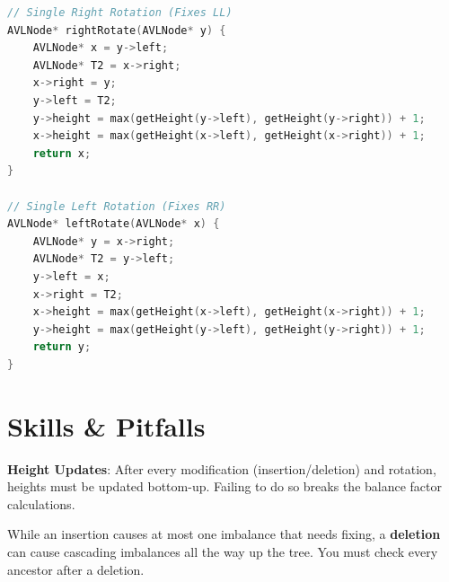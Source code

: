 \begin{lstlisting}[language=C, caption={AVL Single Rotations}]
// Single Right Rotation (Fixes LL)
AVLNode* rightRotate(AVLNode* y) {
    AVLNode* x = y->left;
    AVLNode* T2 = x->right;
    x->right = y;
    y->left = T2;
    y->height = max(getHeight(y->left), getHeight(y->right)) + 1;
    x->height = max(getHeight(x->left), getHeight(x->right)) + 1;
    return x;
}

// Single Left Rotation (Fixes RR)
AVLNode* leftRotate(AVLNode* x) {
    AVLNode* y = x->right;
    AVLNode* T2 = y->left;
    y->left = x;
    x->right = T2;
    x->height = max(getHeight(x->left), getHeight(x->right)) + 1;
    y->height = max(getHeight(y->left), getHeight(y->right)) + 1;
    return y;
}
\end{lstlisting}

\section{Skills \& Pitfalls}

\begin{remark}
\textbf{Height Updates}: After every modification (insertion/deletion) and rotation, heights must be updated bottom-up. Failing to do so breaks the balance factor calculations.
\end{remark}

\begin{exercise}
While an insertion causes at most one imbalance that needs fixing, a \textbf{deletion} can cause cascading imbalances all the way up the tree. You must check every ancestor after a deletion.
\end{exercise}
